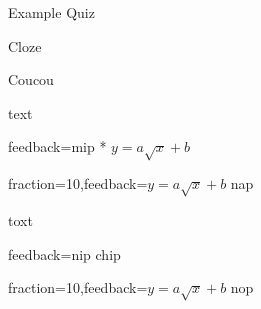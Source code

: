 \documentclass[twocolumn]{article}
\def\myequation{y=a\sqrt{x}+b}
\begin{document}
\begin{quiz}[ %
	points=1, %
	feedback={this is a generic feedback} %
	] {Example Quiz}

\begin{cloze}[points=2]{Cloze}

Coucou

\begin{multi}[points=4,shuffle=false]
text
\item[feedback={mip}]* $\myequation$
\item[fraction=10,feedback={$\myequation$}] nap
\end{multi}

\begin{shortanswer}
toxt
\item[feedback={nip}] chip
\item[fraction=10,feedback={$\myequation$}] nop
\end{shortanswer}

\end{cloze}

\end{quiz}
\end{document}
